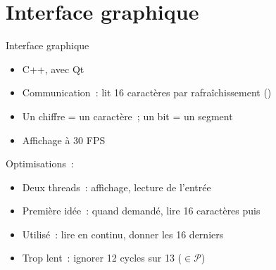 \documentclass[11pt]{beamer}
\begin{document}
\section{Interface graphique}

\begin{frame}{Interface graphique}
\begin{itemize}
\item C++, avec Qt
\item Communication~: lit 16 caractères par rafraîchissement ()
\item Un chiffre = un caractère~; un bit = un segment
\item Affichage à 30 FPS
\end{itemize}

\noindent Optimisations~:
\begin{itemize}
\item \alert{Deux threads}~: affichage, lecture de l'entrée
\item Première idée~: quand demandé, lire 16 caractères puis 
\item Utilisé~: lire en continu, donner les 16 derniers
\item Trop lent~: ignorer \alert{12 cycles sur 13} ($\in \mathcal{P}$)
\end{itemize}
\end{frame}
\end{document}

